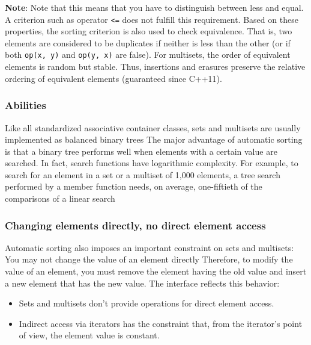 \documentclass{report}
\begin{document}
   \bigbreak \noindent 
   \textbf{Note}: Note that this means that you have to distinguish between less and equal. A criterion such as operator \texttt{<=} does not fulfill this requirement.
   \bigbreak \noindent 
   Based on these properties, the sorting criterion is also used to check equivalence. That is, two elements are considered to be duplicates if neither is less than the other (or if both \texttt{op(x, y)} and \texttt{op(y, x)} are false).
   \bigbreak \noindent 
   For multisets, the order of equivalent elements is random but stable. Thus, insertions and erasures preserve the relative ordering of equivalent elements (guaranteed since C++11).
   \bigbreak \noindent 
   \subsubsection{Abilities}
   \bigbreak \noindent \bigbreak \noindent 
   Like all standardized associative container classes, sets and multisets are usually implemented as balanced binary trees
   \bigbreak \noindent 
   The major advantage of automatic sorting is that a binary tree performs well when elements with
a certain value are searched. In fact, search functions have logarithmic complexity. For example, to
search for an element in a set or a multiset of 1,000 elements, a tree search performed by a member
function needs, on average, one-fiftieth of the comparisons of a linear search

\bigbreak \noindent 
\subsubsection{Changing elements directly, no direct element access}
\bigbreak \noindent 
Automatic sorting also imposes an important constraint on sets and multisets: You may
not change the value of an element directly
\bigbreak \noindent 
Therefore, to modify the value of an element, you must remove the element having the old value and
insert a new element that has the new value. The interface reflects this behavior:
\begin{itemize}
    \item Sets and multisets don’t provide operations for direct element access.
    \item Indirect access via iterators has the constraint that, from the iterator’s point of view, the element value is constant.
\end{itemize}

\bigbreak \noindent 
\end{document}
